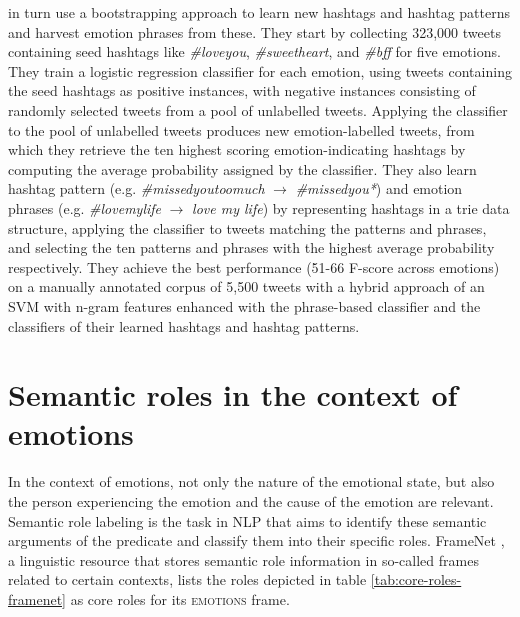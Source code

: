 \citeauthor{twitter_hashtags_bootstrapping} in turn use a bootstrapping approach to learn new hashtags and hashtag patterns and harvest emotion phrases from these. They start by collecting 323,000 tweets containing seed hashtags like \textit{\#loveyou}, \textit{\#sweetheart}, and \textit{\#bff} for five emotions. They train a logistic regression classifier for each emotion, using tweets containing the seed hashtags as positive instances, with negative instances consisting of randomly selected tweets from a pool of unlabelled tweets. Applying the classifier to the pool of unlabelled tweets produces new emotion-labelled tweets, from which they retrieve the ten highest scoring emotion-indicating hashtags by computing the average probability assigned by the classifier. They also learn hashtag pattern (e.g. \textit{\#missedyoutoomuch} $\rightarrow$ \textit{\#missedyou*}) and emotion phrases (e.g. \textit{\#lovemylife} $\rightarrow$ \textit{love my life}) by representing hashtags in a trie data structure, applying the classifier to tweets matching the patterns and phrases, and selecting the ten patterns and phrases with the highest average probability respectively. They achieve the best performance (51-66 F-score across emotions) on a manually annotated corpus of 5,500 tweets with a hybrid approach of an SVM with n-gram features enhanced with the phrase-based classifier and the classifiers of their learned hashtags and hashtag patterns.

\section{Semantic roles in the context of emotions}

In the context of emotions, not only the nature of the emotional state, but also the person experiencing the emotion and the cause of the emotion are relevant. Semantic role labeling is the task in NLP that aims to identify these semantic arguments of the predicate and classify them into their specific roles. FrameNet \cite{framenet}, a linguistic resource that stores semantic role information in so-called frames related to certain contexts, lists the roles depicted in table \ref{tab:core-roles-framenet} as core roles for its \textsc{emotions} frame.

